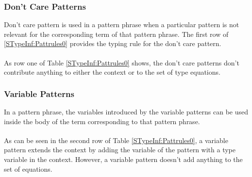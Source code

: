 \documentclass[11pt]{article}
\begin{document}
\subsubsection {Don't Care Patterns}
Don't care pattern is used in a pattern phrase when a particular pattern is not relevant for the corresponding term of that pattern phrase. The first row of \ref {STypeInf:Pattrules0} provides the typing rule for the don't care pattern.
~~\\~~\\ 
As row one of Table \ref{STypeInf:Pattrules0} shows, the don't care patterns don't contribute anything to either the context or to the set of type equations.

\subsubsection {Variable Patterns}
In a pattern phrase, the variables introduced by the variable patterns can be used inside the body of the term corresponding to that pattern phrase.
~~\\~~\\ 
As can be seen in the second row of Table \ref{STypeInf:Pattrules0}, a variable pattern extends the context by adding the variable of the pattern with a type variable in the context. However, a variable pattern doesn't add anything to the set of equations.
\end{document}
